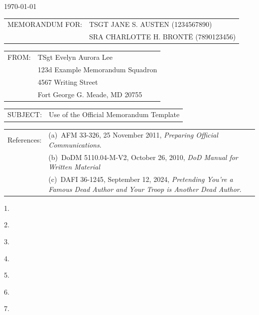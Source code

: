 \documentclass[12pt]{article}
\newlength{\extraSpaceLength}
\newcommand{\setcolumnwidth}[2]{
    \newlength{#1}%
    \settowidth{#1}{#2}%
    \addtolength{#1}{\extraSpaceLength} %
}
\begin{document}
\pagestyle{default}
\thispagestyle{firstpage}


\noindent\hfill\monthyeardate\today


\setcolumnwidth{\memoWidth}{MEMORANDUM FOR:}
\noindent
\begin{tabularx}{\textwidth}{@{} p{\memoWidth} @{} X @{}} 
MEMORANDUM FOR: & TSGT JANE S. AUSTEN (1234567890)\\
                & SRA CHARLOTTE H. BRONTË (7890123456)\\
\end{tabularx}

\setcolumnwidth{\fromWidth}{FROM:}
\noindent
\begin{tabularx}{\textwidth}{@{} p{\fromWidth} @{} X @{}} 
FROM: & TSgt Evelyn Aurora Lee\\
      & 123d Example Memorandum Squadron\\
      & 4567 Writing Street\\
      & Fort George G. Meade, MD 20755 \\
\end{tabularx}

\setcolumnwidth{\subjectWidth}{SUBJECT:}
\noindent
\begin{tabularx}{\textwidth}{@{} p{\subjectWidth} @{} X @{}} 
SUBJECT: & Use of the Official Memorandum Template\\
\end{tabularx}

\setcolumnwidth{\referencesWidth}{References:}
\noindent
\begin{tabularx}{\textwidth}{@{} p{} @{} X @{}} 
References: & (a)~AFM 33-326, 25 November 2011, \textit{Preparing Official Communications}.\\
            & (b)~DoDM 5110.04-M-V2, October 26, 2010, \textit{DoD Manual for Written Material} \\
            & (c)~DAFI 36-1245, September 12, 2024, \textit{Pretending You're a Famous Dead Author and Your Troop is Another Dead Author}.\\
\end{tabularx}

1.~\lipsum[1]

2.~\lipsum[1]

3.~\lipsum[1]

4.~\lipsum[1]

5.~\lipsum[1]

6.~\lipsum[1]

7.~\lipsum[1]

\end{document}
